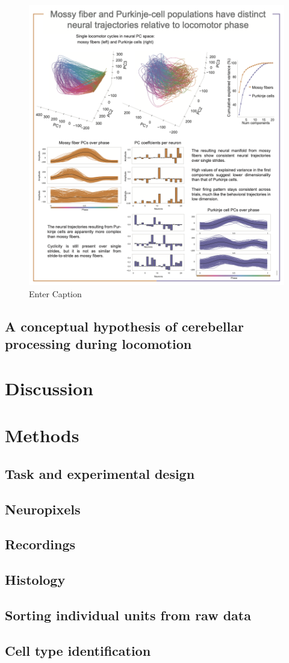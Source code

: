 \begin{figure}
    \centering
    \includegraphics[width=0.99\linewidth]{Chapters/Figures/chapter5/neural_trajectories.png}
    \caption{Enter Caption}
    \label{fig:manifolds}
\end{figure}


\subsection{A conceptual hypothesis of cerebellar processing during locomotion}

\section{Discussion}

\section{Methods}
\subsection{Task and experimental design}
\subsection{Neuropixels}
\subsection{Recordings}
\subsection{Histology}
\subsection{Sorting individual units from raw data}
\subsection{Cell type identification}



